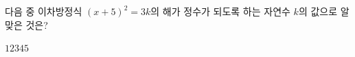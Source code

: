 다음 중 이차방정식 $(x+5)^2=3k$의 해가 정수가 되도록 하는 자연수 $k$의 값으로 알맞은 것은?
\begin{choices32}{$1$}{$2$}{$3$}{$4$}{$5$}\end{choices32}
